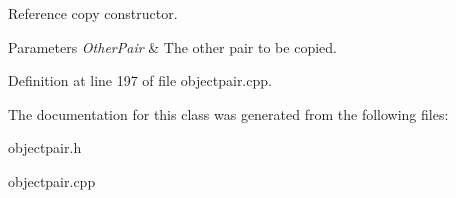 Reference copy constructor. 


\begin{DoxyParams}{Parameters}
{\em OtherPair} & The other pair to be copied. \\
\hline
\end{DoxyParams}


Definition at line 197 of file objectpair.cpp.



The documentation for this class was generated from the following files:\begin{DoxyCompactItemize}
\item 
objectpair.h\item 
objectpair.cpp\end{DoxyCompactItemize}
